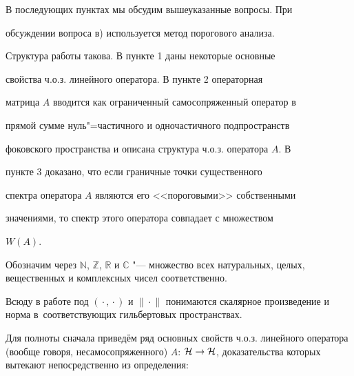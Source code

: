 В последующих пунктах мы обсудим вышеуказанные вопросы. При

обсуждении вопроса в) используется метод порогового анализа.



Структура работы такова. В пункте 1 даны некоторые основные

свойства ч.о.з. линейного оператора. В пункте 2 операторная

матрица $A$ вводится как ограниченный самосопряженный оператор в

прямой сумме нуль"=частичного и одночастичного подпространств

фоковского пространства и описана структура ч.о.з. оператора $A$. В

пункте 3 доказано, что если граничные точки существенного

спектра оператора $A$ являются его <<пороговыми>> собственными

значениями, то спектр этого оператора совпадает с множеством

$W(A)$.



\smallskip



 Обозначим через ${\mathbb N}$, ${\mathbb Z}$, ${\mathbb R}$ и ${\mathbb C}$ "--- множество всех натуральных, целых, вещественных и комплексных чисел соответственно. 

Всюду в работе под $({}\cdot{}, {}\cdot{})$ и $\|{}\cdot{}\|$ понимаются скалярное произведение и норма в~соответствующих гильбертовых пространствах.



Для полноты сначала приведём ряд основных свойств ч.о.з. линейного оператора (вообще говоря, несамосопряженного) $A$: ${\cal H}

\rightarrow {\cal H}$, доказательства которых вытекают непосредственно из определения:



